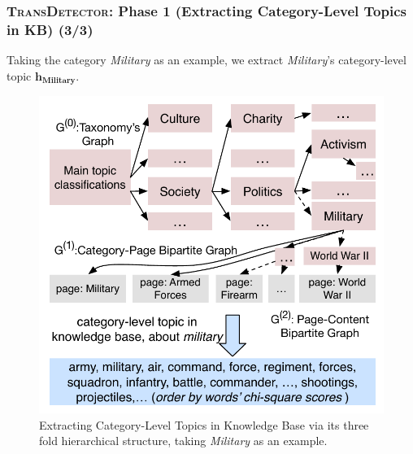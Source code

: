 \documentclass{beamer}
\begin{document}
\begin{frame}
\frametitle{\textsc{TransDetector}: Phase 1 (Extracting Category-Level Topics in KB) (3/3)}	
Taking the category \textit{Military} as an example, we extract \textit{Military}'s category-level topic \(\bm{h_{Military}}\).
\begin{figure}[h]
		\setlength{\abovecaptionskip}{0.cm}
        \setlength{\belowcaptionskip}{0.cm}
        \centering
        \includegraphics[width=0.45\columnwidth]{../img/initializationExample.pdf}
        \caption{Extracting Category-Level Topics in Knowledge Base via its three fold hierarchical structure, taking \textit{Military} as an example.}
        \label{fig:hood}
\end{figure}

\end{frame}
\end{document}
